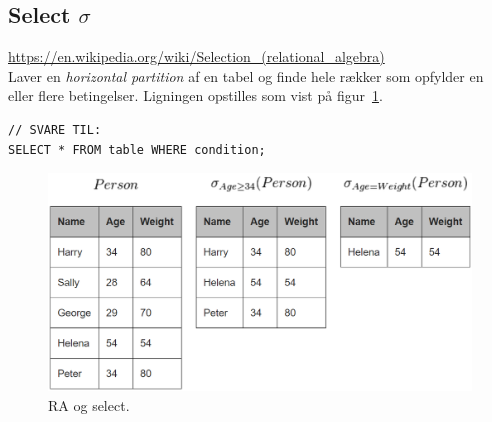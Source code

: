 \subsection{Select $\sigma$}

\url{https://en.wikipedia.org/wiki/Selection_(relational_algebra)}\\

Laver en \textit{horizontal partition} af en tabel og finde hele rækker som opfylder en eller flere betingelser. Ligningen opstilles som vist på figur~\ref{fig:select}.

\begin{lstlisting}[morekeywords={SELECT, FROM, WHERE}]
// SVARE TIL:
SELECT * FROM table WHERE condition;
\end{lstlisting}

\begin{figure}[H]
	\centering
	\includegraphics[width=0.8\linewidth]{figs/spm6/select}
	\caption{RA og select.}
	\label{fig:select}
\end{figure}

%
%
%
%
%
%
